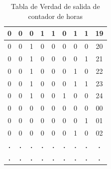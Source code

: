 \documentclass[journal]{IEEEtran}
\begin{document}
\begin{table}[htb]
\begin{tabular}{|c|c|c|c|c|c|c|c|c|}
    0 & 0 & 0 & 1 & 1 & 0 & 1 & 1 & 19 \\ \hline
    0 & 0 & 1 & 0 & 0 & 0 & 0 & 0 & 20 \\ \hline
    0 & 0 & 1 & 0 & 0 & 0 & 0 & 1 & 21 \\ \hline
    0 & 0 & 1 & 0 & 0 & 0 & 1 & 0 & 22 \\ \hline
    0 & 0 & 1 & 0 & 0 & 0 & 1 & 1 & 23 \\ \hline
    \rowcolor[HTML]{F8FF00} 
    0 & 0 & 1 & 0 & 0 & 1 & 0 & 0 & 24 \\ \hline
    0 & 0 & 0 & 0 & 0 & 0 & 0 & 0 & 00 \\ \hline
    0 & 0 & 0 & 0 & 0 & 0 & 0 & 1 & 01 \\ \hline
    0 & 0 & 0 & 0 & 0 & 0 & 1 & 0 & 02 \\ \hline
    \textbf{.} & \textbf{.} & \textbf{.} & \textbf{.} & \textbf{.} & \textbf{.} & \textbf{.} & \textbf{.} & \textbf{.} \\ \hline
    \textbf{.} & \textbf{.} & \textbf{.} & \textbf{.} & \textbf{.} & \textbf{.} & \textbf{.} & \textbf{.} & \textbf{.} \\ \hline
    \end{tabular}
    \caption{Tabla de Verdad de salida de contador de horas}
    \label{tab_reloj}
    \end{table}
    \newline
    
\end{document}
